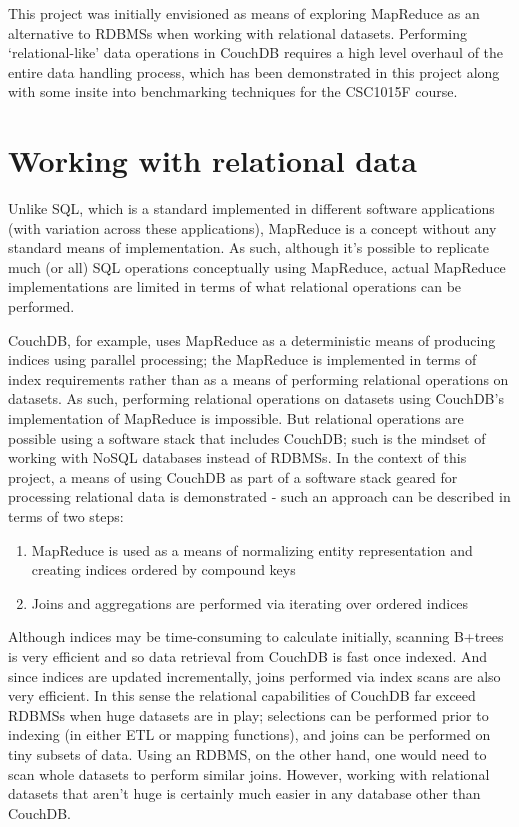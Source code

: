 This project was initially envisioned as means of exploring MapReduce as an alternative to RDBMSs when working with relational datasets. Performing `relational-like' data operations in CouchDB requires a high level overhaul of the entire data handling process, which has been demonstrated in this project along with some insite into benchmarking techniques for the CSC1015F course.

\section{Working with relational data}
Unlike SQL, which is a standard implemented in different software applications (with variation across these applications), MapReduce is a concept without any standard means of implementation. As such, although it's possible to replicate much (or all) SQL operations conceptually using MapReduce, actual MapReduce implementations are limited in terms of what relational operations can be performed.

CouchDB, for example, uses MapReduce as a deterministic means of producing indices using parallel processing; the MapReduce is implemented in terms of index requirements rather than as a means of performing relational operations on datasets. As such, performing relational operations on datasets using CouchDB's implementation of MapReduce is impossible. But relational operations are possible using a software stack that includes CouchDB; such is the mindset of working with NoSQL databases instead of RDBMSs. In the context of this project, a means of using CouchDB as part of a software stack geared for processing relational data is demonstrated - such an approach can be described in terms of two steps:

\begin{enumerate}
    \item MapReduce is used as a means of normalizing entity representation and creating indices ordered by compound keys
    \item Joins and aggregations are performed via iterating over ordered indices
\end{enumerate}

Although indices may be time-consuming to calculate initially, scanning B+trees is very efficient and so data retrieval from CouchDB is fast once indexed. And since indices are updated incrementally, joins performed via index scans are also very efficient. In this sense the relational capabilities of CouchDB far exceed RDBMSs when huge datasets are in play; selections can be performed prior to indexing (in either ETL or mapping functions), and joins can be performed on tiny subsets of data. Using an RDBMS, on the other hand, one would need to scan whole datasets to perform similar joins. However, working with relational datasets that aren't huge is certainly much easier in any database other than CouchDB.